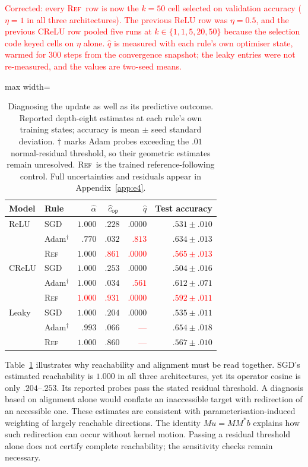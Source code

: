 \documentclass{article}
\newcommand{\nat}[1]{\textcolor{red}{#1}}
\newcommand{\TOU}{\textsc{Ref}}
\theoremstyle{definition}
\theoremstyle{remark}
\begin{document}
\begin{table}[t]
\caption{Diagnosing the update as well as its predictive outcome. Reported depth-eight estimates at each rule's own training states; accuracy is mean $\pm$ seed standard deviation. $\dagger$ marks Adam probes exceeding the $.01$ normal-residual threshold, so their geometric estimates remain unresolved. \TOU\ is the trained reference-following control. Full uncertainties and residuals appear in Appendix~\ref{app:e4}.} \nat{Corrected: every \TOU\ row is now the $k=50$ cell selected on validation accuracy ($\eta=1$ in all three architectures). The previous ReLU row was $\eta=0.5$, and the previous CReLU row pooled five runs at $k\in\{1,1,5,20,50\}$ because the selection code keyed cells on $\eta$ alone. $\widehat q$ is measured with each rule's own optimiser state, warmed for $300$ steps from the convergence snapshot; the leaky entries were not re-measured, and the values are two-seed means.}
\label{tab:main-results}
\centering\small
\begin{adjustbox}{max width=\linewidth}
\begin{tabular}{llrrrr}
\toprule
Model & Rule & $\widehat\alpha$ & $\widehat c_{\rm op}$ & $\widehat q$ & Test accuracy\\
\midrule
ReLU & SGD & $1.000$ & $.228$ & $.0000$ & $.531\pm.010$\\
 & Adam$^\dagger$ & $.770$ & $.032$ & \nat{$.813$} & $.634\pm.013$\\
 & \TOU & $1.000$ & \nat{$.861$} & \nat{$.0000$} & \nat{$.565\pm.013$}\\
CReLU & SGD & $1.000$ & $.253$ & $.0000$ & $.504\pm.016$\\
 & Adam$^\dagger$ & $1.000$ & $.034$ & \nat{$.561$} & $.612\pm.071$\\
 & \TOU & \nat{$1.000$} & \nat{$.931$} & \nat{$.0000$} & \nat{$.592\pm.011$}\\
Leaky & SGD & $1.000$ & $.204$ & $.0000$ & $.535\pm.011$\\
 & Adam$^\dagger$ & $.993$ & $.066$ & \nat{---} & $.654\pm.018$\\
 & \TOU & $1.000$ & $.860$ & \nat{---} & $.567\pm.010$\\
\bottomrule
\end{tabular}
\end{adjustbox}
\end{table}

Table~\ref{tab:main-results} illustrates why reachability and alignment must be read together. SGD's estimated reachability is $1.000$ in all three architectures, yet its operator cosine is only $.204$--$.253$. Its reported probes pass the stated residual threshold. A diagnosis based on alignment alone would conflate an inaccessible target with redirection of an accessible one. These estimates are consistent with parameterisation-induced weighting of largely reachable directions. The identity $Mu=MM^*b$ explains how such redirection can occur without kernel motion. Passing a residual threshold alone does not certify complete reachability; the sensitivity checks remain necessary.
\end{document}
